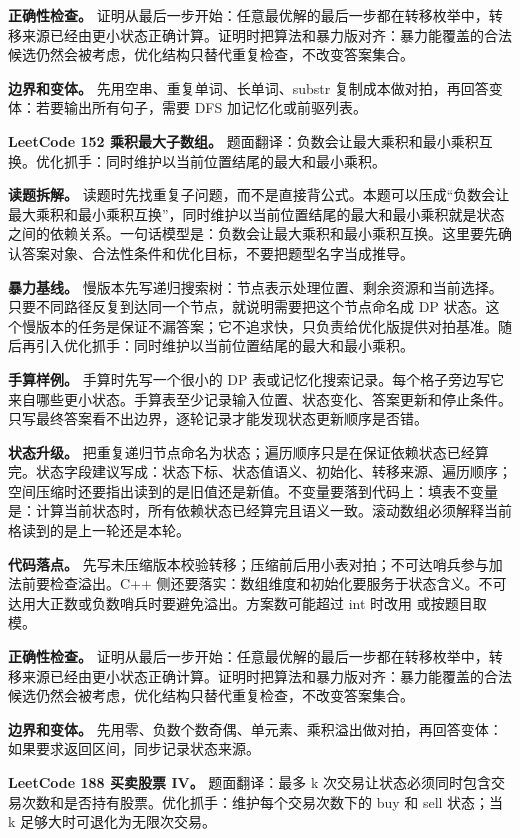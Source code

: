 \textbf{正确性检查。} 证明从最后一步开始：任意最优解的最后一步都在转移枚举中，转移来源已经由更小状态正确计算。证明时把算法和暴力版对齐：暴力能覆盖的合法候选仍然会被考虑，优化结构只替代重复检查，不改变答案集合。

\textbf{边界和变体。} 先用空串、重复单词、长单词、substr 复制成本做对拍，再回答变体：若要输出所有句子，需要 DFS 加记忆化或前驱列表。

\noindent\textbf{LeetCode 152 乘积最大子数组。} 题面翻译：负数会让最大乘积和最小乘积互换。优化抓手：同时维护以当前位置结尾的最大和最小乘积。

\textbf{读题拆解。} 读题时先找重复子问题，而不是直接背公式。本题可以压成“负数会让最大乘积和最小乘积互换”，同时维护以当前位置结尾的最大和最小乘积就是状态之间的依赖关系。一句话模型是：负数会让最大乘积和最小乘积互换。这里要先确认答案对象、合法性条件和优化目标，不要把题型名字当成推导。

\textbf{暴力基线。} 慢版本先写递归搜索树：节点表示处理位置、剩余资源和当前选择。只要不同路径反复到达同一个节点，就说明需要把这个节点命名成 DP 状态。这个慢版本的任务是保证不漏答案；它不追求快，只负责给优化版提供对拍基准。随后再引入优化抓手：同时维护以当前位置结尾的最大和最小乘积。

\textbf{手算样例。} 手算时先写一个很小的 DP 表或记忆化搜索记录。每个格子旁边写它来自哪些更小状态。手算表至少记录输入位置、状态变化、答案更新和停止条件。只写最终答案看不出边界，逐轮记录才能发现状态更新顺序是否错。

\textbf{状态升级。} 把重复递归节点命名为状态；遍历顺序只是在保证依赖状态已经算完。状态字段建议写成：状态下标、状态值语义、初始化、转移来源、遍历顺序；空间压缩时还要指出读到的是旧值还是新值。不变量要落到代码上：填表不变量是：计算当前状态时，所有依赖状态已经算完且语义一致。滚动数组必须解释当前格读到的是上一轮还是本轮。

\textbf{代码落点。} 先写未压缩版本校验转移；压缩前后用小表对拍；不可达哨兵参与加法前要检查溢出。C++ 侧还要落实：数组维度和初始化要服务于状态含义。不可达用大正数或负数哨兵时要避免溢出。方案数可能超过 int 时改用  或按题目取模。

\textbf{正确性检查。} 证明从最后一步开始：任意最优解的最后一步都在转移枚举中，转移来源已经由更小状态正确计算。证明时把算法和暴力版对齐：暴力能覆盖的合法候选仍然会被考虑，优化结构只替代重复检查，不改变答案集合。

\textbf{边界和变体。} 先用零、负数个数奇偶、单元素、乘积溢出做对拍，再回答变体：如果要求返回区间，同步记录状态来源。

\noindent\textbf{LeetCode 188 买卖股票 IV。} 题面翻译：最多 k 次交易让状态必须同时包含交易次数和是否持有股票。优化抓手：维护每个交易次数下的 buy 和 sell 状态；当 k 足够大时可退化为无限次交易。

